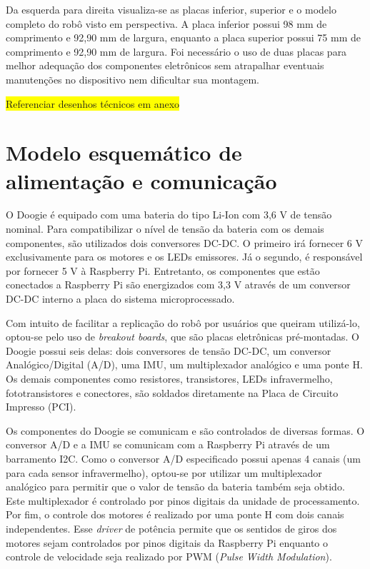 Da esquerda para direita visualiza-se as placas inferior, superior e o modelo completo do robô visto em perspectiva. A placa inferior possui 98 mm de comprimento e 92,90 mm de largura, enquanto a placa superior possui 75 mm de comprimento e 92,90 mm de largura. Foi necessário o uso de duas placas para melhor adequação dos componentes eletrônicos sem atrapalhar eventuais manutenções no dispositivo nem dificultar sua montagem.

\colorbox{yellow}{Referenciar desenhos técnicos em anexo}

\section{Modelo esquemático de alimentação e comunicação}
\label{sec:arquitetura_eletrica_geral}
O Doogie é equipado com uma bateria do tipo Li-Ion com 3,6 V de tensão nominal. Para compatibilizar o nível de tensão da bateria com os demais componentes, são utilizados dois conversores DC-DC. O primeiro irá fornecer 6 V exclusivamente para os motores e os LEDs emissores. Já o segundo, é responsável por fornecer 5 V à Raspberry Pi. Entretanto, os componentes que estão conectados a Raspberry Pi são energizados com 3,3 V através de um conversor DC-DC interno a placa do sistema microprocessado.

Com intuito de facilitar a replicação do robô por usuários que queiram utilizá-lo, optou-se pelo uso de \textit{breakout boards}, que são placas eletrônicas pré-montadas. O Doogie possui seis delas: dois conversores de tensão DC-DC, um conversor Analógico/Digital (A/D), uma IMU, um multiplexador analógico e uma ponte H. Os demais componentes como resistores, transistores, LEDs infravermelho, fototransistores e conectores, são soldados diretamente na Placa de Circuito Impresso (PCI).

Os componentes do Doogie se comunicam e são controlados de diversas formas. O conversor A/D e a IMU se comunicam com a Raspberry Pi através de um barramento I2C. Como o conversor A/D especificado possui apenas 4 canais (um para cada sensor infravermelho), optou-se por utilizar um multiplexador analógico para permitir que o valor de tensão da bateria também seja obtido. Este multiplexador é controlado por pinos digitais da unidade de processamento. Por fim, o controle dos motores é realizado por uma ponte H com dois canais independentes. Esse \textit{driver} de potência permite que os sentidos de giros dos motores sejam controlados por pinos digitais da Raspberry Pi enquanto o controle de velocidade seja realizado por PWM (\textit{Pulse Width Modulation}).

